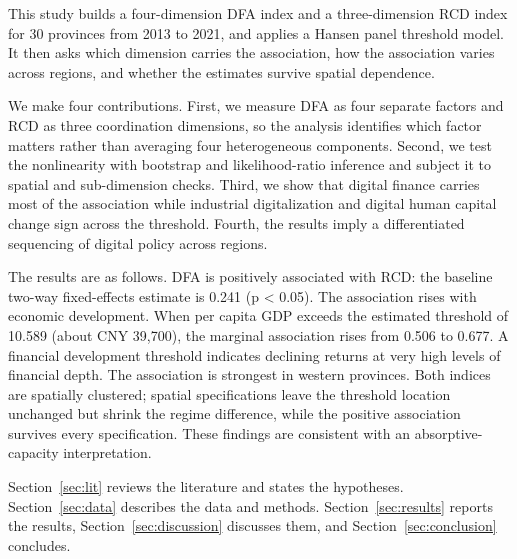 This study builds a four-dimension DFA index and a three-dimension RCD index for 30 provinces from 2013 to 2021, and applies a Hansen panel threshold model. It then asks which dimension carries the association, how the association varies across regions, and whether the estimates survive spatial dependence.

We make four contributions. First, we measure DFA as four separate factors and RCD as three coordination dimensions, so the analysis identifies which factor matters rather than averaging four heterogeneous components. Second, we test the nonlinearity with bootstrap and likelihood-ratio inference and subject it to spatial and sub-dimension checks. Third, we show that digital finance carries most of the association while industrial digitalization and digital human capital change sign across the threshold. Fourth, the results imply a differentiated sequencing of digital policy across regions.

The results are as follows. DFA is positively associated with RCD: the baseline two-way fixed-effects estimate is 0.241 (p < 0.05). The association rises with economic development. When per capita GDP exceeds the estimated threshold of 10.589 (about CNY 39,700), the marginal association rises from 0.506 to 0.677. A financial development threshold indicates declining returns at very high levels of financial depth. The association is strongest in western provinces. Both indices are spatially clustered; spatial specifications leave the threshold location unchanged but shrink the regime difference, while the positive association survives every specification. These findings are consistent with an absorptive-capacity interpretation.

Section~\ref{sec:lit} reviews the literature and states the hypotheses. Section~\ref{sec:data} describes the data and methods. Section~\ref{sec:results} reports the results, Section~\ref{sec:discussion} discusses them, and Section~\ref{sec:conclusion} concludes.
